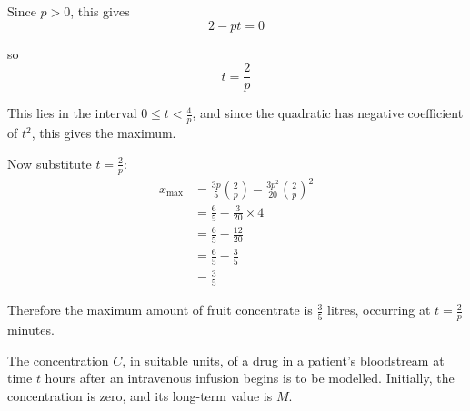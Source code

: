 \documentclass[leqno]{article}
\begin{document}
\begin{enumerate}[
  label=\textbf{\arabic*.},
  leftmargin=*,
  topsep=0pt,
  partopsep=0pt,
  parsep=0pt
]
\begin{djsSolution}
\begin{enumerate}[label=\textbf{(\alph*)}]
\begin{enumerate}[label=(\roman*)]
    Since $p>0$, this gives
    \[
    2-pt=0
    \]

    so
    \[
    t=\frac{2}{p}
    \]

    This lies in the interval $0\leq t<\frac{4}{p}$, and since the quadratic has negative coefficient of $t^2$, this gives the maximum.

    Now substitute $t=\frac{2}{p}$:
    \begin{align*}
    x_{\max}
    &= \frac{3p}{5}\left(\frac{2}{p}\right)-\frac{3p^2}{20}\left(\frac{2}{p}\right)^2 \\
    &= \frac{6}{5}-\frac{3}{20}\times 4 \\
    &= \frac{6}{5}-\frac{12}{20} \\
    &= \frac{6}{5}-\frac{3}{5} \\
    &= \frac{3}{5}
    \end{align*}

    Therefore the maximum amount of fruit concentrate is $\frac{3}{5}$ litres, occurring at $t=\frac{2}{p}$ minutes.
  \end{enumerate}
\end{enumerate}
\end{djsSolution}


\newpage

\questionitem

The concentration $C$, in suitable units, of a drug in a patient's bloodstream at time $t$ hours after an intravenous infusion begins is to be modelled. Initially, the concentration is zero, and its long-term value is $M$. \\


\end{enumerate}
\end{document}
